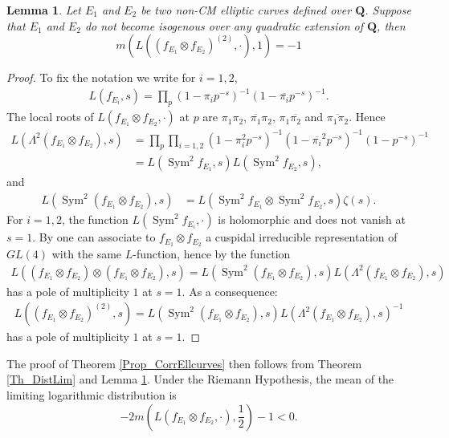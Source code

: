 \documentclass[a4paper,10pt]{amsart}
\theoremstyle{plain}
\newtheorem{lem}[theo]{Lemma}
\theoremstyle{definition}
\begin{document}
\begin{lem}\label{lm_productCE}
Let $E_{1}$ and $E_{2}$ be two non-CM elliptic curves defined over $\mathbf{Q}$.
Suppose that $E_{1}$ and $E_{2}$ do not become isogenous over any quadratic extension of $\mathbf{Q}$,
then
$$m(L((f_{E_{1}}\otimes f_{E_{2}})^{(2)},\cdot),1)=-1$$
\end{lem}
\begin{proof}
To fix the notation we write for  $i=1,2$,
\begin{align*}
L(f_{E_{i}},s) = \prod_{p}(1-\pi_{i}p^{-s})^{-1}(1-\overline{\pi_{i}}p^{-s})^{-1}.
\end{align*}
The local roots of $L(f_{E_{1}}\otimes f_{E_{2}},\cdot)$ at $p$ are $\pi_{1}\pi_{2}$, $\overline{\pi_{1}}\pi_{2}$, $\pi_{1}\overline{\pi_{2}}$ and $\overline{\pi_{1}\pi_{2}}$.
Hence
\begin{align*}
L(\Lambda^{2}(f_{E_{1}}\otimes f_{E_{2}}),s) &=
\prod_{p}\prod_{i=1,2}(1-\pi_{i}^{2}p^{-s})^{-1}(1-\overline{\pi_{i}}^{2}p^{-s})^{-1}(1-p^{-s})^{-1} \\
&= L(\operatorname{Sym}^{2}f_{E_{1}},s)L(\operatorname{Sym}^{2}f_{E_{2}},s),
\end{align*}
and
\begin{align*}
L(\operatorname{Sym}^{2}(f_{E_{1}}\otimes f_{E_{2}}),s) 
&= L(\operatorname{Sym}^{2}f_{E_{1}}\otimes\operatorname{Sym}^{2}f_{E_{2}},s)\zeta(s).
\end{align*}
For $i = 1,2$, the function $L(\operatorname{Sym}^{2}f_{E_{i}},\cdot)$ is holomorphic and does not vanish at $s=1$.
By \cite{Ramakrishnan} one can associate to $f_{E_{1}}\otimes f_{E_{2}}$ a cuspidal irreducible representation of $GL(4)$ with the same $L$-function, 
hence by \cite[App.]{MW} the function 
\begin{align*}
L((f_{E_{1}}\otimes f_{E_{2}})\otimes(f_{E_{1}}\otimes f_{E_{2}}) ,s) = L(\operatorname{Sym}^{2}(f_{E_{1}}\otimes f_{E_{2}}),s)L(\Lambda^{2}(f_{E_{1}}\otimes f_{E_{2}}),s)
\end{align*}
has a pole of multiplicity $1$ at $s=1$.
As a consequence:
\begin{align*}
L((f_{E_{1}}\otimes f_{E_{2}})^{(2)},s) = L(\operatorname{Sym}^{2}(f_{E_{1}}\otimes f_{E_{2}}),s)L(\Lambda^{2}(f_{E_{1}}\otimes f_{E_{2}}),s)^{-1}
\end{align*}
has a pole of multiplicity $1$ at $s=1$.
\end{proof}

The proof of Theorem \ref{Prop_CorrEllcurves}
then follows from Theorem \ref{Th_DistLim} and Lemma \ref{lm_productCE}.
Under the Riemann Hypothesis, 
the mean of the limiting logarithmic distribution is
$$-2m\left(L(f_{E_{1}}\otimes f_{E_{2}},\cdot),\frac{1}{2}\right) - 1 <0.$$
\end{document}
